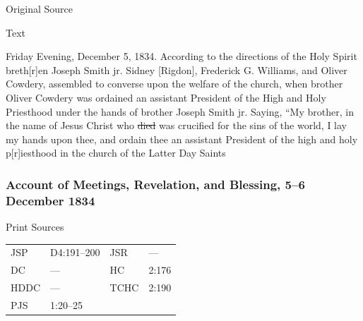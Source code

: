 				\begin{description}
					\item[Original Source]
				\end{description}
				
					
				
				\begin{description}
					\item[Text]
				\end{description}
				
					Friday Evening, December 5, 1834. According to the directions of the Holy Spirit breth[r]en Joseph Smith jr. Sidney [Rigdon], Frederick G. Williams, and Oliver Cowdery, assembled to converse upon the welfare of the church, when brother Oliver Cowdery was ordained an assistant President of the High and Holy Priesthood under the hands of brother Joseph Smith jr. Saying, ``My brother, in the name of Jesus Christ who \sout{died} was crucified for the sins of the world, I lay my hands upon thee, and ordain thee an assistant President of the high and holy p[r]iesthood in the church of the Latter Day Saints
					
		\subsubsection{Account of Meetings, Revelation, and Blessing, 5--6 December 1834}
			\label{EMS-1834-JS-5-6-DEC-1834}
			
			\begin{description}
					\item[Print Sources]
				\end{description}

					\begin{tabular}{p{0.5in}p{1in}p{0.5in}p{1in}}
					JSP	 	& D4:191--200		& JSR 		& --- \\
					DC	 	& --- 		& HC 		& 2:176 \\
					HDDC 	& ---		& TCHC 		& 2:190 \\
					PJS 	& 1:20--25			& 	 		&  \\
					\end{tabular}
				
